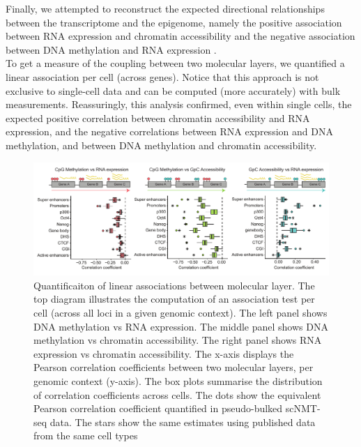 Finally, we attempted to reconstruct the expected directional relationships between the transcriptome and the epigenome, namely the positive association between RNA expression and chromatin accessibility and the negative association between DNA methylation and RNA expression \cite{Thurman2012,Angermueller2016}.\\
To get a measure of the coupling between two molecular layers, we quantified a linear association per cell (across genes). Notice that this approach is not exclusive to single-cell data and can be computed (more accurately) with bulk measurements. Reassuringly, this analysis confirmed, even within single cells, the expected positive correlation between chromatin accessibility and RNA expression, and the negative correlations between RNA expression and DNA methylation, and between DNA methylation and chromatin accessibility.

\begin{figure}[H]
	\centering
	\includegraphics[width=1.0\linewidth]{scNMT_correlations_acrossgenes}
	\caption[]{Quantificaiton of linear associations between molecular layer. The top diagram illustrates the computation of an association test per cell (across all loci in a given genomic context). The left panel shows DNA methylation vs RNA expression. The middle panel shows DNA methylation vs chromatin accessibility. The right panel shows RNA expression vs chromatin accessibility. The x-axis displays the Pearson correlation coefficients between two molecular layers, per genomic context (y-axis). The box plots summarise the distribution of correlation coefficients across cells. The dots show the equivalent Pearson correlation coefficient quantified in pseudo-bulked scNMT-seq data. The stars show the same estimates using published data from the same cell types \cite{Ficz2013,ENCODE2012} }
	\label{fig:scNMT_correlations_acrossgenes}
\end{figure}


